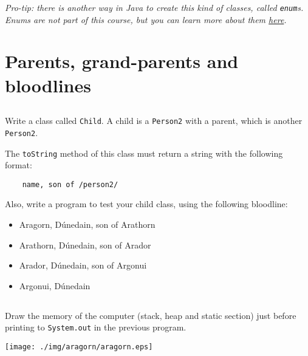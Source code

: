 \documentclass[a4paper, 11pt]{article}
\begin{document}
\textsl{Pro-tip: there is another way in Java to create this kind of classes,
called \texttt{enum}s. Enums are not part of this course, but you can learn
more about them
\href{http://docs.oracle.com/javase/tutorial/java/javaOO/enum.html}{here}.}

















\section{Parents, grand-parents and bloodlines}

\subsection{}

Write a class called \verb+Child+. A child is a \verb+Person2+ with a parent,
which is another \verb+Person2+.

The \verb+toString+ method of this class must return a string with the
following format:

\verb+    name, son of /person2/+

Also, write a program to test your child class, using the following bloodline:

\begin{itemize}

  \item Aragorn, Dúnedain, son of Arathorn

  \item Arathorn, Dúnedain, son of Arador

  \item Arador, Dúnedain, son of Argonui

  \item Argonui, Dúnedain

\end{itemize}













\subsection{}

Draw the memory of the computer (stack, heap and static section) just before
printing to \verb+System.out+ in the previous program.

\begin{solution}
  \texttt{[image: ./img/aragorn/aragorn.eps]}
\end{solution}
\end{document}
